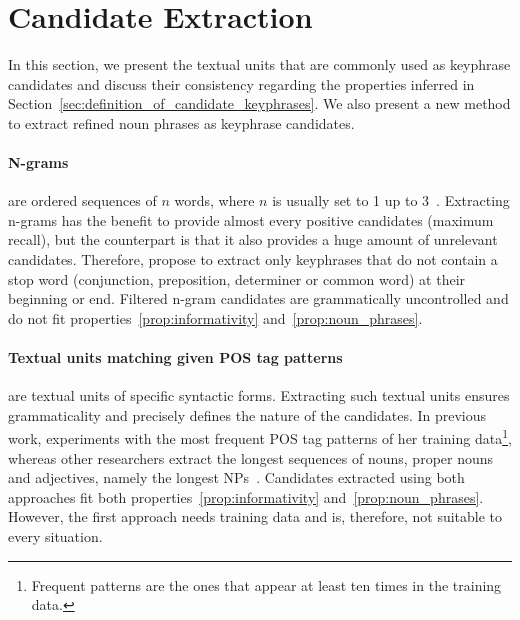\section{Candidate Extraction}
\label{sec:candidate_extraction}

  In this section, we present the textual units that are commonly used as
  keyphrase candidates and discuss their consistency regarding the properties
  inferred in Section~\ref{sec:definition_of_candidate_keyphrases}. We also
  present a new method to extract refined noun phrases as keyphrase candidates.

  \paragraph{N-grams} are ordered sequences of $n$ words, where $n$ is usually
  set to 1 up to 3~\cite{witten1999kea}. Extracting n-grams has the benefit to
  provide almost every positive candidates (maximum recall), but the
  counterpart is that it also provides a huge amount of unrelevant candidates.
  Therefore,  propose to extract only keyphrases that do
  not contain a stop word (conjunction, preposition, determiner or common word)
  at their beginning or end. Filtered n-gram candidates are grammatically
  uncontrolled and do not fit properties~\ref{prop:informativity}
  and~\ref{prop:noun_phrases}.

  \paragraph{Textual units matching given POS tag patterns} are textual units of
  specific syntactic forms. Extracting such textual units ensures grammaticality
  and precisely defines the nature of the candidates. In previous work,
   experiments with the most frequent POS
  tag patterns of her training data\footnote{Frequent patterns are the ones that
  appear at least ten times in the training data.}, whereas other researchers
  extract the longest sequences of nouns, proper nouns and adjectives, namely
  the longest NPs~\cite{hassan2010conundrums}. Candidates extracted using both
  approaches fit both properties~\ref{prop:informativity}
  and~\ref{prop:noun_phrases}. However, the first approach needs training
  data and is, therefore, not suitable to every situation.

